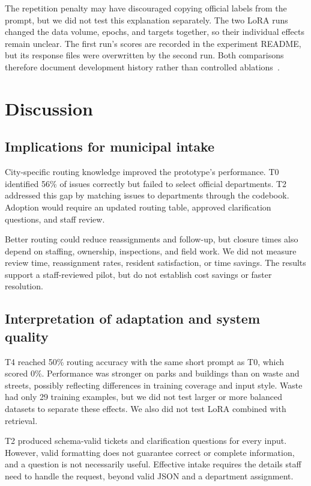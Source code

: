 \documentclass[11pt,letterpaper]{article}
\begin{document}
The repetition penalty may have discouraged copying official labels from the prompt, but we did not test this explanation separately. The two LoRA runs changed the data volume, epochs, and targets together, so their individual effects remain unclear. The first run's scores are recorded in the experiment README, but its response files were overwritten by the second run. Both comparisons therefore document development history rather than controlled ablations~\cite{team}.

\section{Discussion}

\subsection{Implications for municipal intake}

City-specific routing knowledge improved the prototype's performance. T0 identified 56\% of issues correctly but failed to select official departments. T2 addressed this gap by matching issues to departments through the codebook. Adoption would require an updated routing table, approved clarification questions, and staff review.

Better routing could reduce reassignments and follow-up, but closure times also depend on staffing, ownership, inspections, and field work. We did not measure review time, reassignment rates, resident satisfaction, or time savings. The results support a staff-reviewed pilot, but do not establish cost savings or faster resolution.

\subsection{Interpretation of adaptation and system quality}

T4 reached 50\% routing accuracy with the same short prompt as T0, which scored 0\%. Performance was stronger on parks and buildings than on waste and streets, possibly reflecting differences in training coverage and input style. Waste had only 29 training examples, but we did not test larger or more balanced datasets to separate these effects. We also did not test LoRA combined with retrieval.

T2 produced schema-valid tickets and clarification questions for every input. However, valid formatting does not guarantee correct or complete information, and a question is not necessarily useful. Effective intake requires the details staff need to handle the request, beyond valid JSON and a department assignment.
\end{document}
